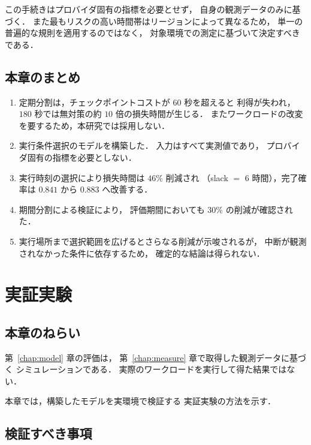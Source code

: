 \documentclass[11pt,a4paper]{ltjsreport}
\begin{document}
この手続きはプロバイダ固有の指標を必要とせず，
自身の観測データのみに基づく．
また最もリスクの高い時間帯はリージョンによって異なるため，
単一の普遍的な規則を適用するのではなく，
対象環境での測定に基づいて決定すべきである．

\section{本章のまとめ}

\begin{enumerate}
  \item 定期分割は，チェックポイントコストが $60$ 秒を超えると
        利得が失われ，$180$ 秒では無対策の約 $10$ 倍の損失時間が生じる．
        またワークロードの改変を要するため，本研究では採用しない．
  \item 実行条件選択のモデルを構築した．
        入力はすべて実測値であり，
        プロバイダ固有の指標を必要としない．
  \item 実行時刻の選択により損失時間は $46\%$ 削減され
        （slack $=$ 6 時間），完了確率は $0.841$ から $0.883$ へ改善する．
  \item 期間分割による検証により，
        評価期間においても $30\%$ の削減が確認された．
  \item 実行場所まで選択範囲を広げるとさらなる削減が示唆されるが，
        中断が観測されなかった条件に依存するため，
        確定的な結論は得られない．
\end{enumerate}

\chapter{実証実験}
\label{chap:exp}

\section{本章のねらい}

第~\ref{chap:model} 章の評価は，
第~\ref{chap:measure} 章で取得した観測データに基づく
シミュレーションである．
実際のワークロードを実行して得た結果ではない．

本章では，構築したモデルを実環境で検証する
実証実験の方法を示す．

\section{検証すべき事項}
\end{document}
